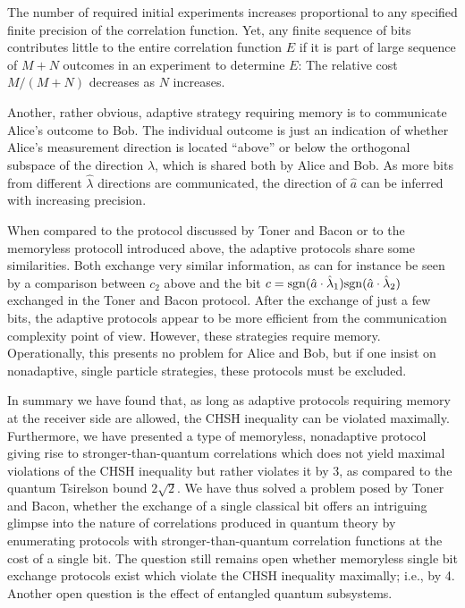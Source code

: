 \documentclass[prl,showpacs,showkeys,amsfonts,preprint]{revtex4}
\begin{document}
The number of required initial experiments increases proportional
to any specified finite precision of the correlation function.
Yet, any finite sequence of bits contributes little to the entire correlation function
$E$ if it is part of large sequence of $M+N$ outcomes in an experiment to determine
$E$: The relative cost $M/(M+N)$ decreases as $N$ increases.


Another, rather obvious,  adaptive strategy  requiring  memory
is to communicate Alice's outcome to Bob.
The individual outcome is just an indication of
whether Alice's measurement direction is located ``above'' or below the
orthogonal subspace of the direction $ {\hat \lambda }$,
which is shared both by Alice and Bob.
As more bits from different ${\hat \lambda }$ directions are communicated,
the direction of ${\hat a}$ can be inferred  with increasing precision.

When compared to the protocol discussed by Toner and Bacon \cite{toner-bacon-03}
or to the memoryless protocoll introduced above,
the adaptive protocols share some similarities.
Both exchange very similar information,
as can for instance be seen by a comparison between $c_2$ above
and the bit
$c= {\rm sgn}({\hat a} \cdot {\hat \lambda }_1 ){\rm sgn}({\hat a} \cdot {\hat \lambda }_2 )$
exchanged in the  Toner and Bacon protocol.
After the exchange of just a few bits, the adaptive protocols
appear to be more efficient
from the communication complexity point of view.
However, these strategies  require memory.
Operationally, this presents no problem for Alice and Bob,
but if one insist on nonadaptive, single particle strategies,
these protocols must be excluded.


In summary we have found that, as long as adaptive protocols
requiring memory at the receiver side are allowed,
the CHSH inequality can be violated maximally.
Furthermore, we have presented a type of memoryless, nonadaptive protocol
giving rise to stronger-than-quantum correlations which
does not yield maximal violations of the CHSH inequality but rather violates it by 3,
as compared to the quantum Tsirelson bound $2\sqrt{2}$.
We have thus solved a problem posed by Toner and Bacon, whether
the exchange of a single classical bit offers an intriguing glimpse
into the nature of correlations produced in quantum
theory
by enumerating protocols with stronger-than-quantum correlation functions
at the cost of a single bit.
The question still remains open whether memoryless single bit exchange protocols exist
which violate the CHSH inequality maximally; i.e., by 4.
Another open question is the effect of entangled quantum subsystems.
\end{document}
